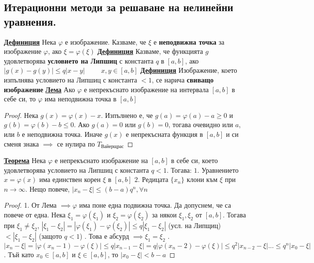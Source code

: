 \documentclass{article}
\begin{document}
\subsection*{Итерационни методи за решаване на нелинейни уравнения.}
\textbf{\underline{Дефиниция}}
Нека $\varphi$ е изображение. Казваме, че $\xi$ е \textbf{неподвижна точка} за изображение $\varphi$, ако $\xi = \varphi(\xi)$\newline\newline
\textbf{\underline{Дефиниция}}
Казваме, че функцията $g$ удовлетворява \textbf{условието на Липшиц} с константа $q$ в $[a, b]$, ако $|g(x) - g(y)| \le q|x - y| \hspace{1cm}
x, y \in [a, b]$ \newline\newline
\textbf{\underline{Дефиниция}}
Изображение, което изпълнява условието на Липшиц с константа $< 1$, се нарича \textbf{свиващо изображение} \newline\newline
\textbf{\underline{Лема}} \newline
Ако $\varphi$ е непрекъснато изображение на интервала $[a, b]$ в себе си, то $\varphi$ има неподвижна точка в $[a, b]$
\begin{proof}
Нека $g(x) = \varphi(x) - x$. Изпълнено е, че $g(a) = \varphi(a) - a \ge 0$ и $g(b) = \varphi(b) - b \le 0$. Ако $g(a) = 0$ или
$g(b) = 0$, тогава очевидно или $a$, или $b$ е неподвижна точка. Иначе $g(x)$ е непрекъсната функция в $[a, b]$ и си сменя знака
$\implies$ се нулира по $T_{\text{Вайерщрас}}$
\end{proof}
\textbf{\underline{Теорема}} \newline
Нека $\varphi$ е непрекъснато изображение на $[a, b]$ в себе си, което удовлетворява условието на Липшиц с константа $q < 1$.
Тогава: \newline\newline
$1.$ Уравнението $x = \varphi(x)$ има единствен корен $\xi$ в $[a, b]$ \newline\newline
$2.$ Редицата $\{x_n\}$ клони към $\xi$ при $n \rightarrow \infty$. Нещо повече, $|x_n - \xi| \le (b - a)q^n, \forall n$
\begin{proof}
1. От Лема $\implies \varphi$ има поне една подвижна точка. Да допуснем, че са повече от една. Нека
$\xi_1 = \varphi(\xi_1)$ и $\xi_2 = \varphi(\xi_2)$ за някои $\xi_1, \xi_2$ от $[a, b]$. Тогава при $\xi_1 \neq
\xi_2$, $|\xi_1 - \xi_2| = |\varphi(\xi_1) - \varphi(\xi_2)| \le q|\xi_1 - \xi_2|$ (усл. на Липщиц) $< |\xi_1 -
\xi_2|$ (защото $q < 1$) . Това е абсурд $\implies \xi_1 = \xi_2$ \newline{}. $|x_n - \xi| = |\varphi(x_n - 1) - \varphi(\xi)| \le q|x_{n-1} - \xi| = q|\varphi(x_n - 2) - \varphi(\xi)|
\le q^2|x_{n-2} - \xi| ... \le q^n|x_0 - \xi|$. Тъй като $x_0 \in [a, b]$ и $\xi \in [a, b]$, то $|x_0 - \xi| < b - a$
\end{proof}
\end{document}
